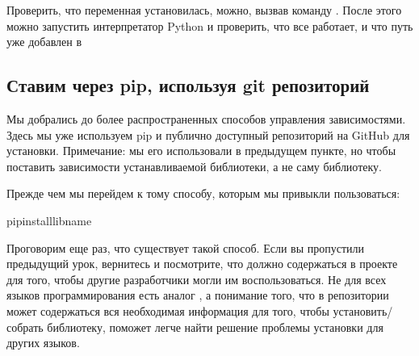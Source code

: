 \documentclass[letterpaper,10pt,russian]{sphinxmanual}
\begin{document}
\begin{sphinxVerbatim}[commandchars=\\\{\}]
\end{sphinxVerbatim}

\sphinxAtStartPar
Проверить, что переменная установилась, можно, вызвав команду . После этого можно запустить интерпретатор Python и проверить, что все работает, и что путь уже добавлен в 


\subsection{Ставим через pip, используя git репозиторий}
\label{\detokenize{educational_materials/packaging/content:pip-git}}
\sphinxAtStartPar
Мы добрались до более распространенных способов управления зависимостями. Здесь мы уже используем pip и публично доступный репозиторий на GitHub для установки. Примечание: мы его использовали в предыдущем пункте, но чтобы поставить зависимости устанавливаемой библиотеки, а не саму библиотеку.

\sphinxAtStartPar
Прежде чем мы перейдем к тому способу, которым мы привыкли пользоваться:

\begin{sphinxVerbatim}[commandchars=\\\{\}]
pipinstalllib\PYGZus{}name
\end{sphinxVerbatim}

\sphinxAtStartPar
Проговорим еще раз, что существует такой способ. Если вы пропустили предыдущий урок, вернитесь и посмотрите, что должно содержаться в проекте для того, чтобы другие разработчики могли им воспользоваться. Не для всех языков программирования есть аналог , а понимание того, что в репозитории может содержаться вся необходимая информация для того, чтобы установить/собрать библиотеку, поможет легче найти решение проблемы установки для других языков.
\end{document}
